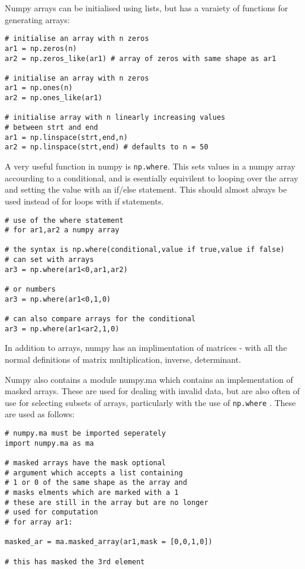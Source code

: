 \documentclass[11pt,a4paper]{article}
\begin{document}
Numpy arrays can be initialised using lists, but has a varaiety of functions for generating arrays:

\begin{verbatim}
# initialise an array with n zeros
ar1 = np.zeros(n)
ar2 = np.zeros_like(ar1) # array of zeros with same shape as ar1

# initialise an array with n zeros
ar1 = np.ones(n)
ar2 = np.ones_like(ar1) 

# initialise array with n linearly increasing values
# between strt and end  
ar1 = np.linspace(strt,end,n)
ar2 = np.linspace(strt,end) # defaults to n = 50

\end{verbatim}

A very useful function in numpy is \verb|np.where|. This sets values in a numpy array accourding to a conditional, and is esentially equivilent to looping over the array and setting the value with an if/else statement. This should almost always be used instead of for loops with if statements. 

\begin{verbatim}
# use of the where statement
# for ar1,ar2 a numpy array

# the syntax is np.where(conditional,value if true,value if false)
# can set with arrays
ar3 = np.where(ar1<0,ar1,ar2)

# or numbers
ar3 = np.where(ar1<0,1,0)

# can also compare arrays for the conditional
ar3 = np.where(ar1<ar2,1,0)

\end{verbatim} 

In addition to arrays, numpy has an implimentation of matrices - with all the normal definitions of matrix multiplication, inverse, determinant.

Numpy also contains a module numpy.ma which contains an implementation of masked arrays. These are used for dealing with invalid data, but are also often of use for selecting subsets of arrays, particularly with the use of \verb|np.where| . These are used as follows:

\begin{verbatim}
# numpy.ma must be imported seperately
import numpy.ma as ma

# masked arrays have the mask optional
# argument which accepts a list containing
# 1 or 0 of the same shape as the array and
# masks elments which are marked with a 1
# these are still in the array but are no longer
# used for computation 
# for array ar1:

masked_ar = ma.masked_array(ar1,mask = [0,0,1,0])

# this has masked the 3rd element

\end{verbatim}
\end{document}
